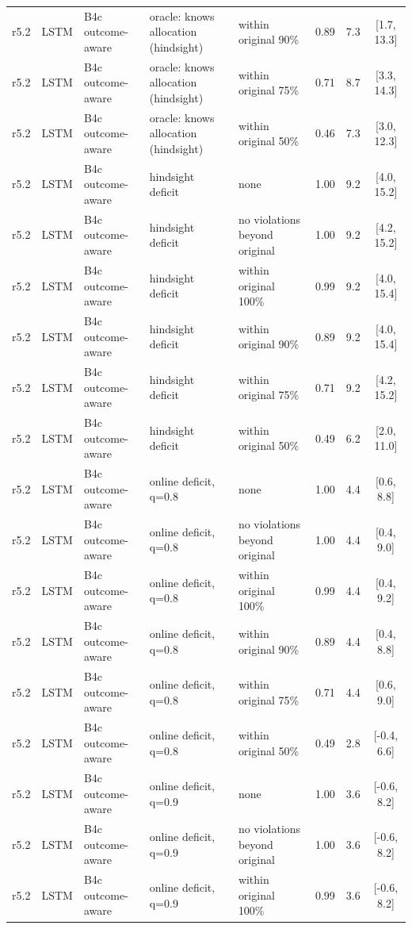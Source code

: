 \documentclass[10pt,onecolumn,letterpaper]{article}
\begin{document}
\begin{longtable}{lllp{4.2cm}p{3.4cm}ccc}
r5.2 & LSTM & B4c outcome-aware & oracle: knows allocation (hindsight) & within original 90\% & 0.89 & 7.3 & [1.7, 13.3] \\
r5.2 & LSTM & B4c outcome-aware & oracle: knows allocation (hindsight) & within original 75\% & 0.71 & 8.7 & [3.3, 14.3] \\
r5.2 & LSTM & B4c outcome-aware & oracle: knows allocation (hindsight) & within original 50\% & 0.46 & 7.3 & [3.0, 12.3] \\
r5.2 & LSTM & B4c outcome-aware & hindsight deficit & none & 1.00 & 9.2 & [4.0, 15.2] \\
r5.2 & LSTM & B4c outcome-aware & hindsight deficit & no violations beyond original & 1.00 & 9.2 & [4.2, 15.2] \\
r5.2 & LSTM & B4c outcome-aware & hindsight deficit & within original 100\% & 0.99 & 9.2 & [4.0, 15.4] \\
r5.2 & LSTM & B4c outcome-aware & hindsight deficit & within original 90\% & 0.89 & 9.2 & [4.0, 15.4] \\
r5.2 & LSTM & B4c outcome-aware & hindsight deficit & within original 75\% & 0.71 & 9.2 & [4.2, 15.2] \\
r5.2 & LSTM & B4c outcome-aware & hindsight deficit & within original 50\% & 0.49 & 6.2 & [2.0, 11.0] \\
r5.2 & LSTM & B4c outcome-aware & online deficit, q=0.8 & none & 1.00 & 4.4 & [0.6, 8.8] \\
r5.2 & LSTM & B4c outcome-aware & online deficit, q=0.8 & no violations beyond original & 1.00 & 4.4 & [0.4, 9.0] \\
r5.2 & LSTM & B4c outcome-aware & online deficit, q=0.8 & within original 100\% & 0.99 & 4.4 & [0.4, 9.2] \\
r5.2 & LSTM & B4c outcome-aware & online deficit, q=0.8 & within original 90\% & 0.89 & 4.4 & [0.4, 8.8] \\
r5.2 & LSTM & B4c outcome-aware & online deficit, q=0.8 & within original 75\% & 0.71 & 4.4 & [0.6, 9.0] \\
r5.2 & LSTM & B4c outcome-aware & online deficit, q=0.8 & within original 50\% & 0.49 & 2.8 & [-0.4, 6.6] \\
r5.2 & LSTM & B4c outcome-aware & online deficit, q=0.9 & none & 1.00 & 3.6 & [-0.6, 8.2] \\
r5.2 & LSTM & B4c outcome-aware & online deficit, q=0.9 & no violations beyond original & 1.00 & 3.6 & [-0.6, 8.2] \\
r5.2 & LSTM & B4c outcome-aware & online deficit, q=0.9 & within original 100\% & 0.99 & 3.6 & [-0.6, 8.2] \\

\end{longtable}
\end{document}

